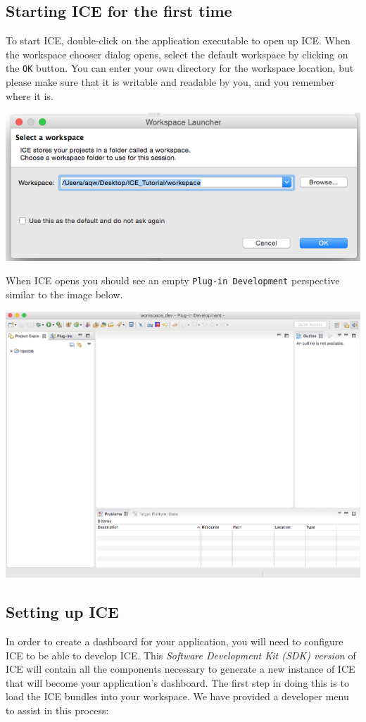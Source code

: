 \subsection{Starting ICE for the first time}
To start ICE, double-click on the application executable to open up ICE. When the workspace chooser
dialog opens, select the default workspace by clicking on the \texttt{OK}
button.
You can enter your own directory for the workspace location, but please make sure that it is writable and readable by you, and you remember where it is.
\begin{center} \includegraphics[width=\textwidth]{figures/workspace}
\end{center}
When ICE opens you should see an empty \texttt{Plug-in Development} perspective
similar to the image below.
\begin{center} \includegraphics[width=\textwidth]{figures/expectedICE}
\end{center} 

\subsection{Setting up ICE}
In order to create a dashboard for your application, you will need to configure ICE to
be able to develop ICE. This \textit{Software Development Kit (SDK) version} of
ICE will contain all the components necessary to generate a new instance of ICE that will become your application's dashboard. 
The first step in doing this is to load the ICE bundles into
your workspace. We have provided a developer menu to assist in this process:

